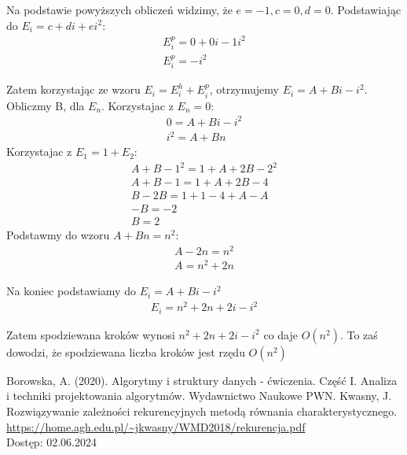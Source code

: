 \documentclass[12pt,oneside,a4paper]{book} %
\theoremstyle{break}
\begin{document}
Na podstawie powyższych obliczeń widzimy, że $e=-1, c=0, d=0$.
Podstawiając do $E_i=c+di+ei^2$:
\begin{align*}
  E_i^p=0+0i-1i^2\\
  E_i^p=-i^2
\end{align*}

Zatem korzystając ze wzoru $E_i=E_i^h+E_i^p$, otrzymujemy $E_i=A+Bi-i^2$.
Obliczmy B, dla $E_n$. Korzystajac z $E_n=0$:
\begin{align*}
  0=A+Bi-i^2\\
  i^2=A+Bn
\end{align*}
Korzystajac z $E_1=1+E_2$:
\begin{align*}
  A+B-1^2=1+A+2B-2^2\\
  A+B-1=1+A+2B-4\\
  B-2B=1+1-4+A-A\\
  -B=-2\\
  B=2
\end{align*}
Podstawmy do wzoru $A+Bn=n^2$:
\begin{align*}
  A-2n=n^2\\
  A=n^2+2n
\end{align*}

Na koniec podstawiamy do $E_i=A+Bi-i^2$
\begin{align*}
  E_i=n^2+2n+2i-i^2
\end{align*}

Zatem spodziewana kroków wynosi $n^2+2n+2i-i^2$ co daje $O(n^2)$.
To zaś dowodzi, że spodziewana liczba kroków jest rzędu $O(n^2)$

\begin{thebibliography}{00}
  Borowska, A. (2020). Algorytmy i struktury danych - ćwiczenia. Część I. Analiza i techniki projektowania algorytmów. Wydawnictwo Naukowe PWN.
  Kwasny, J. Rozwiązywanie zależności rekurencyjnych metodą
  równania charakterystycznego. \url{https://home.agh.edu.pl/~jkwasny/WMD2018/rekurencja.pdf}\\
  Dostęp: 02.06.2024
\end{thebibliography}
\end{document}

